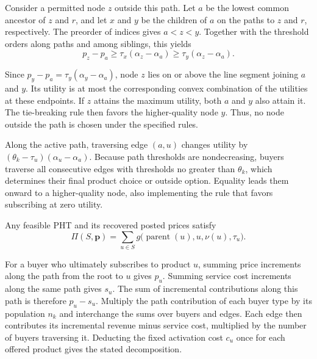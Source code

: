 \begin{IEEEproof}
Consider a permitted node $z$ outside this path. Let $a$ be the lowest common ancestor of $z$ and $r$, and let $x$ and $y$ be the children of $a$ on the paths to $z$ and $r$, respectively. The preorder of indices gives $a<z<y$. Together with the threshold orders along paths and among siblings, this yields
\begin{equation}
p_z-p_a
\ge\tau_x(\alpha_z-\alpha_a)
\ge\tau_y(\alpha_z-\alpha_a).
\label{eq:s4_6}
\tag{S1}
\end{equation}

Since $p_y-p_a=\tau_y(\alpha_y-\alpha_a)$, node $z$ lies on or above the line segment joining $a$ and $y$. Its utility is at most the corresponding convex combination of the utilities at these endpoints. If $z$ attains the maximum utility, both $a$ and $y$ also attain it. The tie-breaking rule then favors the higher-quality node $y$. Thus, no node outside the path is chosen under the specified rules.

Along the active path, traversing edge $(a,u)$ changes utility by $(\theta_k-\tau_u)(\alpha_u-\alpha_a)$. Because path thresholds are nondecreasing, buyers traverse all consecutive edges with thresholds no greater than $\theta_k$, which determines their final product choice or outside option. Equality leads them onward to a higher-quality node, also implementing the rule that favors subscribing at zero utility.%
\end{IEEEproof}

\begin{proposition}\label{prop:edge_decomposition}
Any feasible PHT and its recovered posted prices satisfy
\begin{equation}
\Pi(S,\mathbf p)=
\sum_{u\in S}
g\bigl(\operatorname{parent}(u),u,\nu(u),\tau_u\bigr).
\label{eq:s4_10}
\tag{12}
\end{equation}
\end{proposition}

\begin{IEEEproof}
For a buyer who ultimately subscribes to product $u$, summing price increments along the path from the root to $u$ gives $p_u$. Summing service cost increments along the same path gives $s_u$. The sum of incremental contributions along this path is therefore $p_u-s_u$. Multiply the path contribution of each buyer type by its population $n_k$ and interchange the sums over buyers and edges. Each edge then contributes its incremental revenue minus service cost, multiplied by the number of buyers traversing it. Deducting the fixed activation cost $c_u$ once for each offered product gives the stated decomposition.%
\end{IEEEproof}

